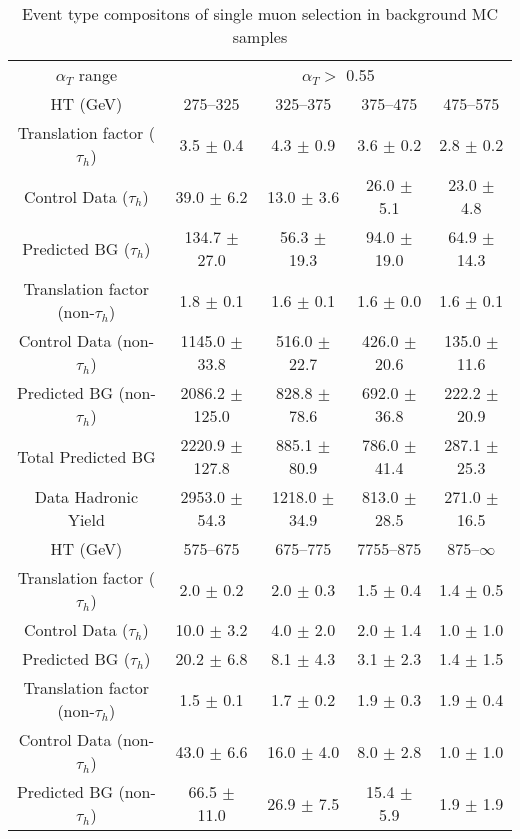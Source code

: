 \documentclass[a4paper,12pt]{article}
\begin{document}
 
\begin{table}[htl] 
\caption{Event type compositons of single muon selection in background MC samples}
 \begin{flushleft}
 \begin{tabular}{ c|cccc }
\hline
$ \alpha_T $ range   &  \multicolumn{4}{c}{$\alpha_T > $ 0.55}\\ 
  HT (GeV) & 275--325 & 325--375 & 375--475 & 475--575 \\ 
 Translation factor ($\tau_h$) & 3.5 $\pm$ 0.4  & 4.3 $\pm$ 0.9  & 3.6 $\pm$ 0.2  & 2.8 $\pm$ 0.2 \\ 
Control Data ($\tau_h$) & 39.0 $\pm$ 6.2  & 13.0 $\pm$ 3.6  & 26.0 $\pm$ 5.1  & 23.0 $\pm$ 4.8 \\ 
Predicted BG ($\tau_h$) & 134.7 $\pm$ 27.0  & 56.3 $\pm$ 19.3  & 94.0 $\pm$ 19.0  & 64.9 $\pm$ 14.3 \\ 
\hline
Translation factor (non-$\tau_h$) & 1.8 $\pm$ 0.1  & 1.6 $\pm$ 0.1  & 1.6 $\pm$ 0.0  & 1.6 $\pm$ 0.1 \\ 
Control Data (non-$\tau_h$) & 1145.0 $\pm$ 33.8  & 516.0 $\pm$ 22.7  & 426.0 $\pm$ 20.6  & 135.0 $\pm$ 11.6 \\ 
Predicted BG (non-$\tau_h$) & 2086.2 $\pm$ 125.0  & 828.8 $\pm$ 78.6  & 692.0 $\pm$ 36.8  & 222.2 $\pm$ 20.9 \\ 
\hline
Total Predicted BG & 2220.9 $\pm$ 127.8  & 885.1 $\pm$ 80.9  & 786.0 $\pm$ 41.4  & 287.1 $\pm$ 25.3 \\ 
Data Hadronic Yield & 2953.0 $\pm$ 54.3  & 1218.0 $\pm$ 34.9  & 813.0 $\pm$ 28.5  & 271.0 $\pm$ 16.5 \\ 
\hline
 HT (GeV) & 575--675 & 675--775 & 7755--875 & 875--$\infty$ \\ 
 Translation factor ($\tau_h$) & 2.0 $\pm$ 0.2  & 2.0 $\pm$ 0.3  & 1.5 $\pm$ 0.4  & 1.4 $\pm$ 0.5 \\ 
Control Data ($\tau_h$) & 10.0 $\pm$ 3.2  & 4.0 $\pm$ 2.0  & 2.0 $\pm$ 1.4  & 1.0 $\pm$ 1.0 \\ 
Predicted BG ($\tau_h$) & 20.2 $\pm$ 6.8  & 8.1 $\pm$ 4.3  & 3.1 $\pm$ 2.3  & 1.4 $\pm$ 1.5 \\ 
\hline
Translation factor (non-$\tau_h$) & 1.5 $\pm$ 0.1  & 1.7 $\pm$ 0.2  & 1.9 $\pm$ 0.3  & 1.9 $\pm$ 0.4 \\ 
Control Data (non-$\tau_h$) & 43.0 $\pm$ 6.6  & 16.0 $\pm$ 4.0  & 8.0 $\pm$ 2.8  & 1.0 $\pm$ 1.0 \\ 
Predicted BG (non-$\tau_h$) & 66.5 $\pm$ 11.0  & 26.9 $\pm$ 7.5  & 15.4 $\pm$ 5.9  & 1.9 $\pm$ 1.9 \\ 

\end{tabular}
\end{flushleft}
\end{table}
\end{document}
